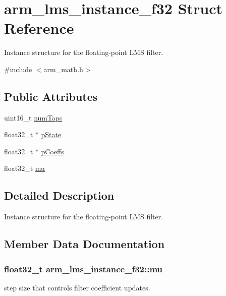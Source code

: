 \hypertarget{structarm__lms__instance__f32}{}\section{arm\+\_\+lms\+\_\+instance\+\_\+f32 Struct Reference}
\label{structarm__lms__instance__f32}


Instance structure for the floating-\/point L\+MS filter.  




{\ttfamily \#include $<$arm\+\_\+math.\+h$>$}

\subsection*{Public Attributes}
\begin{DoxyCompactItemize}
\item 
uint16\+\_\+t \hyperlink{structarm__lms__instance__f32_af73880d9009982f5d14529869494ec3d}{num\+Taps}
\item 
float32\+\_\+t $\ast$ \hyperlink{structarm__lms__instance__f32_aaf94285be2f99b5b9af40bea8dcb14b9}{p\+State}
\item 
float32\+\_\+t $\ast$ \hyperlink{structarm__lms__instance__f32_a4795c6f7d3f17cec15c2fd09f66edd1a}{p\+Coeffs}
\item 
float32\+\_\+t \hyperlink{structarm__lms__instance__f32_ae2af43d74c93dba16b876e10c97a5b99}{mu}
\end{DoxyCompactItemize}


\subsection{Detailed Description}
Instance structure for the floating-\/point L\+MS filter. 

\subsection{Member Data Documentation}
\subsubsection[{\texorpdfstring{mu}{mu}}]{\setlength{\rightskip}{0pt plus 5cm}float32\+\_\+t arm\+\_\+lms\+\_\+instance\+\_\+f32\+::mu}\hypertarget{structarm__lms__instance__f32_ae2af43d74c93dba16b876e10c97a5b99}{}\label{structarm__lms__instance__f32_ae2af43d74c93dba16b876e10c97a5b99}
step size that controls filter coefficient updates. 
